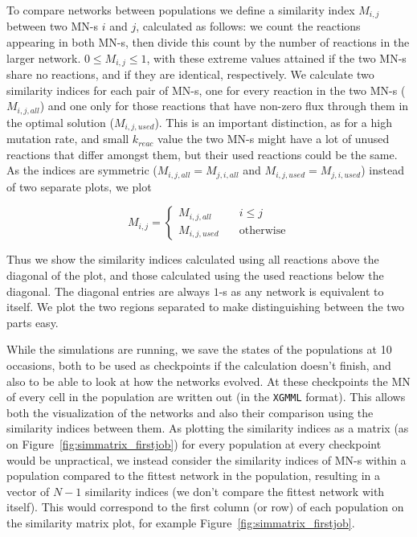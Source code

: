 \documentclass[a4paper,12pt]{article}
\begin{document}
To compare networks between populations we define a similarity index $M_{i,j}$ between two MN-s $i$ and $j$, calculated as follows: we count the reactions appearing in both MN-s, then divide this count by the number of reactions in the larger network. $0\leq M_{i,j} \leq 1$, with these extreme values attained if the two MN-s share no reactions, and if they are identical, respectively. We calculate two similarity indices for each pair of MN-s, one for every reaction in the two MN-s ($M_{i,j,all}$) and one only for those reactions that have non-zero flux through them in the optimal solution ($M_{i,j,used}$). This is an important distinction, as for a high mutation rate, and small $k_{reac}$ value the two MN-s might have a lot of unused reactions that differ amongst them, but their used reactions could be the same.  As the indices are symmetric ($M_{i,j,all}=M_{j,i,all}$ and  $M_{i,j,used}=M_{j,i,used}$) instead of two separate plots, we plot 

$$
M_{i,j}= \left\{
	\begin{array}{ll}
		M_{i,j,all} & \quad i \leq j \\
		M_{i,j,used} & \quad \text{otherwise}
	\end{array}
\right.
$$

Thus we show the similarity indices calculated using all reactions above the diagonal of the plot, and those calculated using the used reactions below the diagonal. The diagonal entries are always $1$-s as any network is equivalent to itself. We plot the two regions separated to make distinguishing between the two parts easy.

While the simulations are running, we save the states of the populations at 10 occasions, both to be used as checkpoints if the calculation doesn't finish, and also to be able to look at how the networks evolved. At these checkpoints the MN of every cell in the population are written out (in the \texttt{XGMML} format). This allows both the visualization of the networks and also their comparison using the similarity indices between them. As plotting the similarity indices as a matrix (as on Figure~\ref{fig:simmatrix_firstjob}) for every population at every checkpoint would be unpractical, we instead consider the similarity indices of MN-s within a population compared to the fittest network in the population, resulting in a vector of $N-1$ similarity indices (we don't compare the fittest network with itself). This would correspond to the first column (or row) of each population on the similarity matrix plot, for example Figure~\ref{fig:simmatrix_firstjob}.
\end{document}
